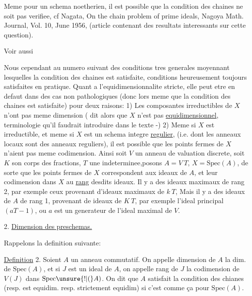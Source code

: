 Meme pour un schema  noetherien, il est possible que la condition
des chaines ne soit pas verifiee, cf Nagata, On the chain problem of
prime ideals, Nagoya Math. Journal, Vol. 10, June 1956, 
(article contenant des resultats interessants sur cette question).

Voir aussi

Nous  cependant au numero suivant des conditions tres generales
moyennant lesquelles la condition des chaines est satisfaite, conditions
heureusement toujours satisfaites en pratique. Quant a l'equidimensionnalite
stricte, elle peut etre en defaut dans des cas non
pathologiques (donc lors meme que la condition des chaines est satisfaite)
pour deux raisons: 1) Les composantes irreductibles de $X$ n'ont
pas meme dimension  ( dit alors que $X$ n'est pas \uline{equidimensionnel}\deleted{\unsure{)}},
terminologie qu'il faudrait introduire dans le texte -) 2) Meme si
$X$ est irreductible, et meme si $X$ est un schema integre \uline{regulier}, (i.e.
dont les anneaux locaux sont des anneaux reguliers), il est possible
que les points fermes de $X$ n'aient pas meme codimension. Ainsi soit $V$
un anneau de valuation discrete, soit $K$ son corps des fractions,  $T$ une
indeterminee,posons $A=V\ T$, $X=\mathrm{Spec}(A)$, de sorte que les points
fermes de $X$ correspondent aux ideaux  de $A$, et leur codimension
dans $X$ au \uline{rang} desdits ideaux. Il y a des ideaux maximaux de 
rang 2, par exemple ceux provenant d'ideaux maximaux de $k\ T$, 
 Mais  il y a des ideaux
 de $A$ de rang 1, provenant de  ideaux  de $K\ T$,
par exemple l'ideal principal $(aT-1)$, ou $a$ est un generateur de
l'ideal maximal de $V$.

2. \uline{Dimension des preschemas.}

Rappelons la definition suivante:

\uline{Definition} 2. Soient $A$ un anneau commutatif. On appelle dimension de
$A$ la dim. de $\mathrm{Spec}(A)$, et si $J$ est un ideal de $A$, on appelle rang de $J$
la codimension de $V(J)$ dans $\mathrm{Spec}\unsure{!|(}A)$. On dit que $A$  satisfait
la condition des chianes (resp. est equidim. resp. strictement equidim)
si c'est comme ça pour $\mathrm{Spec}(A)$.

